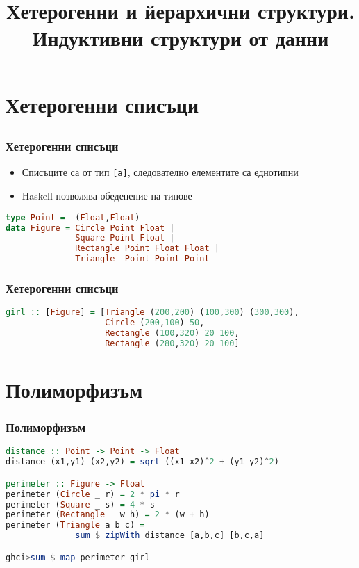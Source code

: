 \documentclass{beamer}
\begin{document}
\title[Индуктивни СД]{Хетерогенни и йерархични структури. \\ Индуктивни структури от данни}
\frame{\titlepage}

\section{Хетерогенни списъци}
\subsection{}

\begin{frame}[fragile]
\frametitle{Хетерогенни списъци}

\begin{itemize}
  \item Списъците са от тип \verb#[a]#, следователно елементите са еднотипни
  \item Haskell позволява обеденение на типове
\end{itemize}

\bigskip

\begin{lstlisting}[basicstyle=\small,language=Haskell]
type Point =  (Float,Float)
data Figure = Circle Point Float | 
              Square Point Float |
              Rectangle Point Float Float |
              Triangle  Point Point Point 
\end{lstlisting}
\end{frame}

\begin{frame}[fragile]
  \frametitle{Хетерогенни списъци}
  
  \begin{lstlisting}[basicstyle=\small,language=Haskell]
girl :: [Figure] = [Triangle (200,200) (100,300) (300,300),
                    Circle (200,100) 50,
                    Rectangle (100,320) 20 100,
                    Rectangle (280,320) 20 100]
  \end{lstlisting}
\end{frame}

\section{Полиморфизъм}

\begin{frame}[fragile]
  \frametitle{Полиморфизъм}
  
  \begin{lstlisting}[basicstyle=\small,language=Haskell]
distance :: Point -> Point -> Float
distance (x1,y1) (x2,y2) = sqrt ((x1-x2)^2 + (y1-y2)^2)

perimeter :: Figure -> Float
perimeter (Circle _ r) = 2 * pi * r
perimeter (Square _ s) = 4 * s
perimeter (Rectangle _ w h) = 2 * (w + h)
perimeter (Triangle a b c) = 
              sum $ zipWith distance [a,b,c] [b,c,a]

ghci>sum $ map perimeter girl              
  \end{lstlisting}
\end{frame}
\end{document}
